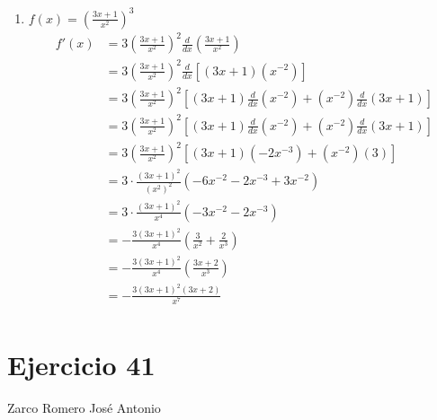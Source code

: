 \documentclass[12pt]{article}
\begin{document}
\begin{enumerate}[label=(\alph*)]
\item $f(x)=\left( \frac{3x+1}{x^2} \right)^3$
  \begin{equation*}
    \begin{split}
      f'(x)
      &= 3\left( \frac{3x+1}{x^2} \right)^2 \frac{d}{dx}\left( \frac{3x+1}{x^2} \right)\\
      &= 3\left( \frac{3x+1}{x^2} \right)^2 \frac{d}{dx}\left[(3x+1)(x^{-2})\right]\\
      &= 3\left( \frac{3x+1}{x^2} \right)^2 \left[
      (3x+1)\frac{d}{dx}(x^{-2})+(x^{-2})\frac{d}{dx}(3x+1) \right]\\
      &= 3\left( \frac{3x+1}{x^2} \right)^2 \left[
      (3x+1)\frac{d}{dx}(x^{-2})+(x^{-2})\frac{d}{dx}(3x+1) \right]\\
      &= 3\left( \frac{3x+1}{x^2} \right)^2 \left[ (3x+1)(-2x^{-3})+(x^{-2})(3) \right]\\
      &= 3\cdot \frac{(3x+1)^2}{(x^2)^2} \left( -6x^{-2}-2x^{-3}+3x^{-2} \right)\\
      &= 3 \cdot \frac{(3x+1)^2}{x^4} \left( -3x^{-2}-2x^{-3} \right)\\
      &= -\frac{3(3x+1)^2}{x^4} \left( \frac{3}{x^2}+\frac{2}{x^3} \right)\\
      &= -\frac{3(3x+1)^2}{x^4} \left( \frac{3x+2}{x^3} \right)\\
      &= -\frac{3(3x+1)^2(3x+2)}{x^7} \\
    \end{split}
  \end{equation*}
  
\end{enumerate}

\section{Ejercicio 41} Zarco Romero José Antonio \\
\end{document}
